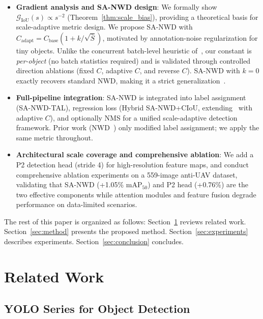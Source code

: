 \documentclass[journal]{IEEEtran}
\begin{document}
\begin{itemize}
  \item \textbf{Gradient analysis and SA-NWD design}: We formally show $\mathcal{G}_{\text{IoU}}(s) \propto s^{-2}$ (Theorem~\ref{thm:scale_bias}), providing a theoretical basis for scale-adaptive metric design. We propose SA-NWD with $C_{\text{adapt}} = C_{\text{base}}(1+k/\sqrt{\bar{S}})$, motivated by annotation-noise regularization for tiny objects. Unlike the concurrent batch-level heuristic of~\cite{zhong2025asanwd}, our constant is \emph{per-object} (no batch statistics required) and is validated through controlled direction ablations (fixed $C$, adaptive $C$, and reverse $C$). SA-NWD with $k=0$ exactly recovers standard NWD, making it a strict generalization~\cite{wang2022nwd}.

  \item \textbf{Full-pipeline integration}: SA-NWD is integrated into label assignment (SA-NWD-TAL), regression loss (Hybrid SA-NWD+CIoU, extending~\cite{lei2025rfwnet} with adaptive $C$), and optionally NMS for a unified scale-adaptive detection framework. Prior work (NWD~\cite{wang2022nwd}) only modified label assignment; we apply the same metric throughout.

  \item \textbf{Architectural scale coverage and comprehensive ablation}: We add a P2 detection head (stride 4) for high-resolution feature maps, and conduct comprehensive ablation experiments on a 559-image anti-UAV dataset, validating that SA-NWD (+1.05\% mAP$_{50}$) and P2 head (+0.76\%) are the two effective components while attention modules and feature fusion degrade performance on data-limited scenarios.
\end{itemize}

The rest of this paper is organized as follows: Section~\ref{sec:related} reviews related work. Section~\ref{sec:method} presents the proposed method. Section~\ref{sec:experiments} describes experiments. Section~\ref{sec:conclusion} concludes.

\section{Related Work}
\label{sec:related}

\subsection{YOLO Series for Object Detection}
\end{document}
